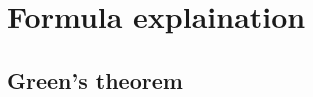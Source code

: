 \documentclass[a4paper]{article}
\begin{document}
\section{Formula explaination}
\subsection{Green's theorem}








\end{document}
